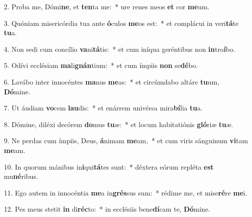 2. Proba me, Dómi\textbf{ne}, et \textbf{ten}ta me:~*  ure renes meos \textbf{et} cor \textbf{me}um.\

3. Quóniam misericórdia tua ante \textbf{ó}culos \textbf{me}os est:~*  et complácui in veri\textbf{tá}te \textbf{tu}a.\

4. Non sedi cum concílio \textbf{va}ni\textbf{tá}tis:~*  et cum iníqua geréntibus non \textbf{in}tro\textbf{í}bo.\

5. Odívi ecclésiam \textbf{ma}li\textbf{gnán}tium:~*  et cum ímpiis \textbf{non} se\textbf{dé}bo.\

6. Lavábo inter innocéntes \textbf{ma}nus \textbf{me}as:~*  et circúmdabo altáre \textbf{tu}um, \textbf{Dó}mine.\

7. Ut áudiam \textbf{vo}cem \textbf{lau}dis:~*  et enárrem univérsa mira\textbf{bí}lia \textbf{tu}a.\

8. Dómine, diléxi decórem \textbf{do}mus \textbf{tu}æ:~*  et locum habitatiónis \textbf{gló}riæ \textbf{tu}æ.\

9. Ne perdas cum ímpiis, Deus, \textbf{á}nimam \textbf{me}am,~*  et cum viris sánguinum \textbf{vi}tam \textbf{me}am.\

10. In quorum mánibus in\textbf{i}qui\textbf{tá}tes sunt:~*  déxtera eórum repléta \textbf{est} mu\textbf{né}ribus.\

11. Ego autem in innocéntia \textbf{me}a in\textbf{grés}sus sum:~*  rédime me, et mise\textbf{ré}re \textbf{me}i.\

12. Pes meus stetit \textbf{in} di\textbf{réc}to:~*  in ecclésiis bene\textbf{dí}cam te, \textbf{Dó}mine.\

